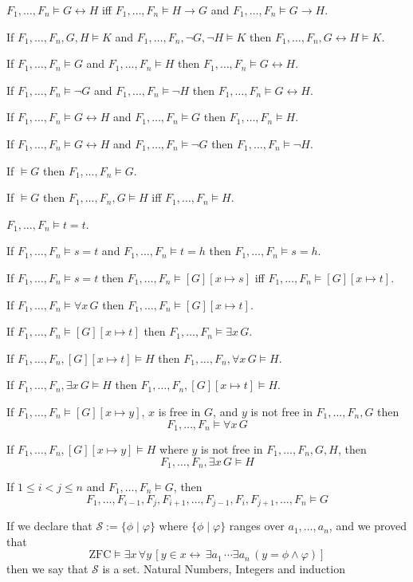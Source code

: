 \documentclass[11pt]{book}
\begin{document}
{	\item $F_1,\dots,F_n\vDash G\leftrightarrow H$ iff $F_1,\dots,F_n\vDash H\rightarrow G$ and $F_1,\dots,F_n\vDash G\rightarrow H$.
	\item If $F_1,\dots,F_n,G,H\vDash K$ and $F_1,\dots,F_n,\neg G,\neg H\vDash K$ then $F_1,\dots,F_n,G\leftrightarrow H\vDash K$.
	\item If $F_1,\dots,F_n\vDash G$ and $F_1,\dots,F_n\vDash H$ then $F_1,\dots,F_n\vDash G\leftrightarrow H$.
	\item If $F_1,\dots,F_n\vDash \neg G$ and $F_1,\dots,F_n\vDash \neg H$ then $F_1,\dots,F_n\vDash G\leftrightarrow H$.
	\item If $F_1,\dots,F_n\vDash G\leftrightarrow H$ and $F_1,\dots,F_n\vDash G$ then $F_1,\dots,F_n\vDash H$.
	\item If $F_1,\dots,F_n\vDash G\leftrightarrow H$ and $F_1,\dots,F_n\vDash \neg G$ then $F_1,\dots,F_n\vDash \neg H$.
	\item If $\vDash G$ then $F_1,\dots,F_n\vDash G$.
	\item If $\vDash G$ then $F_1,\dots,F_n,G\vDash H$ iff $F_1,\dots,F_n\vDash H$.
	\item $F_1,\dots,F_n\vDash t=t$.
	\item If $F_1,\dots,F_n\vDash s=t$ and $F_1,\dots,F_n\vDash t=h$ then $F_1,\dots,F_n\vDash s=h$.
	\item If $F_1,\dots,F_n\vDash s=t$ then $F_1,\dots,F_n\vDash [G][x\mapsto s]$ iff $F_1,\dots,F_n\vDash [G][x\mapsto t]$.
	\item If $F_1,\dots,F_n\vDash \forall x\,G$ then $F_1,\dots,F_n\vDash [G][x\mapsto t]$.
	\item If $F_1,\dots,F_n\vDash [G][x\mapsto t]$ then $F_1,\dots,F_n\vDash \exists x\, G$.
	\item If $F_1,\dots,F_n,[G][x\mapsto t]\vDash H$ then $F_1,\dots,F_n,\forall x\, G\vDash H$.
	\item If $F_1,\dots,F_n,\exists x\,G\vDash H$ then $F_1,\dots,F_n, [G][x\mapsto t]\vDash H$.
	\item If $F_1,\dots,F_n\vDash [G][x\mapsto y]$, $x$ is free in $G$, and $y$ is not free in $F_1,\dots,F_n, G$ then \[F_1,\dots,F_n\vDash\forall x\, G\]
	\item If $F_1,\dots,F_n,[G][x\mapsto y]\vDash H$ where $y$ is not free in $F_1,\dots,F_n,G,H$, then 
	\[F_1,\dots,F_n,\exists x\,G\vDash H\]
	\item If $1\le i<j\le n$ and $F_1,\dots,F_n\vDash G$, then
	\[F_1,\dots,F_{i-1},F_{j},F_{i+1},\dots,F_{j-1},F_{i},F_{j+1},\dots,F_n\vDash G\]
}
If we declare that $\mathcal{S}:=\{\phi\mid \varphi\}$ where $\{\phi\mid \varphi\}$ ranges over $a_1,\dots,a_n$, and we proved that 
\[\mathrm{ZFC}\vDash \exists x\,\forall y \,[y\in x\leftrightarrow \,\exists a_1\,\cdots \exists a_n\,(y=\phi\land \varphi)]\]
then we say that $\mathcal{S}$ is a set.
Natural Numbers, Integers and induction
\newpage
\end{document}

